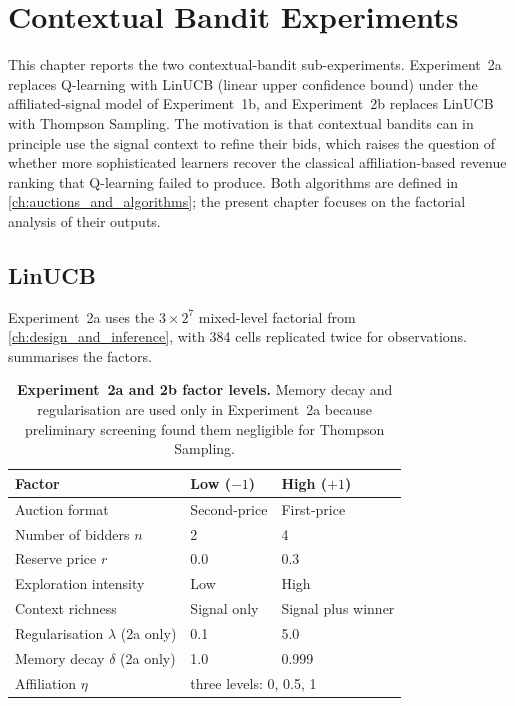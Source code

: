 \chapter{Contextual Bandit Experiments}
\label{ch:bandits}

This chapter reports the two contextual-bandit sub-experiments. Experiment~2a replaces Q-learning with LinUCB (linear upper confidence bound) under the affiliated-signal model of Experiment~1b, and Experiment~2b replaces LinUCB with Thompson Sampling. The motivation is that contextual bandits can in principle use the signal context to refine their bids, which raises the question of whether more sophisticated learners recover the classical affiliation-based revenue ranking that Q-learning failed to produce. Both algorithms are defined in \cref{ch:auctions_and_algorithms}; the present chapter focuses on the factorial analysis of their outputs.

\section{LinUCB}
\label{sec:exp2a_results}

Experiment~2a uses the $3 \times 2^7$ mixed-level factorial from \cref{ch:design_and_inference}, with 384 cells replicated twice for \ExpTwoANobs{} observations.  summarises the factors.

\begin{table}[H]
\centering
\caption[Experiment~2a and 2b factor levels]{\textbf{Experiment~2a and 2b factor levels.} Memory decay and regularisation are used only in Experiment~2a because preliminary screening found them negligible for Thompson Sampling.}
\label{tab:exp2_params_summary}
\begin{tabular}{l l l}
\toprule
\textbf{Factor} & \textbf{Low} ($-1$) & \textbf{High} ($+1$)\\
\midrule
Auction format & Second-price & First-price \\
Number of bidders $n$ & 2 & 4 \\
Reserve price $r$ & 0.0 & 0.3 \\
Exploration intensity & Low & High \\
Context richness & Signal only & Signal plus winner \\
Regularisation $\lambda$ (2a only) & 0.1 & 5.0 \\
Memory decay $\delta$ (2a only) & 1.0 & 0.999 \\
Affiliation $\eta$ & \multicolumn{2}{l}{three levels: 0, 0.5, 1} \\
\bottomrule
\end{tabular}
\end{table}

